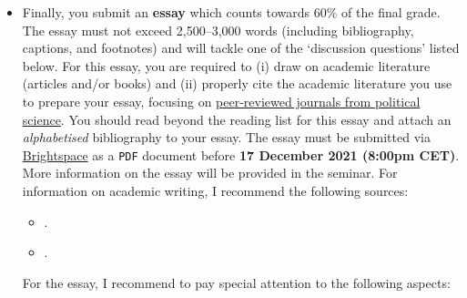 \documentclass[abstract=on,parskip=full,headings=standardclasses,fontsize=11pt,paper=a4]{scrartcl}
\begin{document}
\begin{itemize}
\item Finally, you submit an \textbf{essay}  which counts towards 60\% of the final grade. The essay must not exceed 2,500--3,000 words  (including bibliography, captions, and footnotes) and  will tackle one of the `discussion questions' listed below. For this essay, you are required to (i) draw on academic literature (articles and/or books) and (ii) properly cite the academic literature you use to prepare your essay, focusing on \href{https://ooir.org/journals.php?category=polisci}{peer-reviewed journals from political science}. You should read beyond the reading list for this essay and attach an \textit{alphabetised}  bibliography to your essay. The essay must be submitted via \href{https://brightspace.ucd.ie}{Brightspace} as a \texttt{PDF} document before \textbf{17 December 2021 (8:00pm CET)}. More information on the essay will be provided in the seminar. For information on academic writing, I recommend the following sources:

\begin{itemize}
\item {}.
\item {}.
\end{itemize}

For the essay, I recommend to pay special attention to the following aspects:


\end{itemize}
\end{document}
